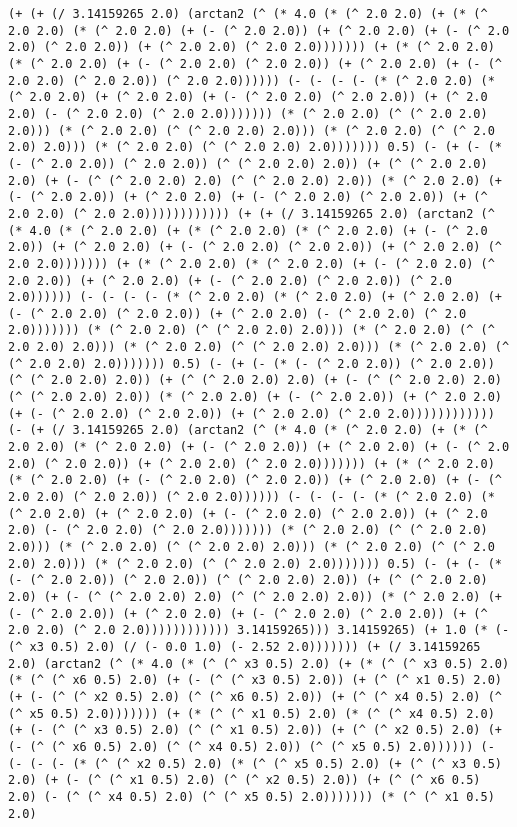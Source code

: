 \begin{lstlisting}
(+ (+ (/ 3.14159265 2.0) (arctan2 (^ (* 4.0 (* (^ 2.0 2.0) (+ (* (^ 2.0 2.0) (* (^ 2.0 2.0) (+ (- (^ 2.0 2.0)) (+ (^ 2.0 2.0) (+ (- (^ 2.0 2.0) (^ 2.0 2.0)) (+ (^ 2.0 2.0) (^ 2.0 2.0))))))) (+ (* (^ 2.0 2.0) (* (^ 2.0 2.0) (+ (- (^ 2.0 2.0) (^ 2.0 2.0)) (+ (^ 2.0 2.0) (+ (- (^ 2.0 2.0) (^ 2.0 2.0)) (^ 2.0 2.0)))))) (- (- (- (- (* (^ 2.0 2.0) (* (^ 2.0 2.0) (+ (^ 2.0 2.0) (+ (- (^ 2.0 2.0) (^ 2.0 2.0)) (+ (^ 2.0 2.0) (- (^ 2.0 2.0) (^ 2.0 2.0))))))) (* (^ 2.0 2.0) (^ (^ 2.0 2.0) 2.0))) (* (^ 2.0 2.0) (^ (^ 2.0 2.0) 2.0))) (* (^ 2.0 2.0) (^ (^ 2.0 2.0) 2.0))) (* (^ 2.0 2.0) (^ (^ 2.0 2.0) 2.0))))))) 0.5) (- (+ (- (* (- (^ 2.0 2.0)) (^ 2.0 2.0)) (^ (^ 2.0 2.0) 2.0)) (+ (^ (^ 2.0 2.0) 2.0) (+ (- (^ (^ 2.0 2.0) 2.0) (^ (^ 2.0 2.0) 2.0)) (* (^ 2.0 2.0) (+ (- (^ 2.0 2.0)) (+ (^ 2.0 2.0) (+ (- (^ 2.0 2.0) (^ 2.0 2.0)) (+ (^ 2.0 2.0) (^ 2.0 2.0)))))))))))) (+ (+ (/ 3.14159265 2.0) (arctan2 (^ (* 4.0 (* (^ 2.0 2.0) (+ (* (^ 2.0 2.0) (* (^ 2.0 2.0) (+ (- (^ 2.0 2.0)) (+ (^ 2.0 2.0) (+ (- (^ 2.0 2.0) (^ 2.0 2.0)) (+ (^ 2.0 2.0) (^ 2.0 2.0))))))) (+ (* (^ 2.0 2.0) (* (^ 2.0 2.0) (+ (- (^ 2.0 2.0) (^ 2.0 2.0)) (+ (^ 2.0 2.0) (+ (- (^ 2.0 2.0) (^ 2.0 2.0)) (^ 2.0 2.0)))))) (- (- (- (- (* (^ 2.0 2.0) (* (^ 2.0 2.0) (+ (^ 2.0 2.0) (+ (- (^ 2.0 2.0) (^ 2.0 2.0)) (+ (^ 2.0 2.0) (- (^ 2.0 2.0) (^ 2.0 2.0))))))) (* (^ 2.0 2.0) (^ (^ 2.0 2.0) 2.0))) (* (^ 2.0 2.0) (^ (^ 2.0 2.0) 2.0))) (* (^ 2.0 2.0) (^ (^ 2.0 2.0) 2.0))) (* (^ 2.0 2.0) (^ (^ 2.0 2.0) 2.0))))))) 0.5) (- (+ (- (* (- (^ 2.0 2.0)) (^ 2.0 2.0)) (^ (^ 2.0 2.0) 2.0)) (+ (^ (^ 2.0 2.0) 2.0) (+ (- (^ (^ 2.0 2.0) 2.0) (^ (^ 2.0 2.0) 2.0)) (* (^ 2.0 2.0) (+ (- (^ 2.0 2.0)) (+ (^ 2.0 2.0) (+ (- (^ 2.0 2.0) (^ 2.0 2.0)) (+ (^ 2.0 2.0) (^ 2.0 2.0)))))))))))) (- (+ (/ 3.14159265 2.0) (arctan2 (^ (* 4.0 (* (^ 2.0 2.0) (+ (* (^ 2.0 2.0) (* (^ 2.0 2.0) (+ (- (^ 2.0 2.0)) (+ (^ 2.0 2.0) (+ (- (^ 2.0 2.0) (^ 2.0 2.0)) (+ (^ 2.0 2.0) (^ 2.0 2.0))))))) (+ (* (^ 2.0 2.0) (* (^ 2.0 2.0) (+ (- (^ 2.0 2.0) (^ 2.0 2.0)) (+ (^ 2.0 2.0) (+ (- (^ 2.0 2.0) (^ 2.0 2.0)) (^ 2.0 2.0)))))) (- (- (- (- (* (^ 2.0 2.0) (* (^ 2.0 2.0) (+ (^ 2.0 2.0) (+ (- (^ 2.0 2.0) (^ 2.0 2.0)) (+ (^ 2.0 2.0) (- (^ 2.0 2.0) (^ 2.0 2.0))))))) (* (^ 2.0 2.0) (^ (^ 2.0 2.0) 2.0))) (* (^ 2.0 2.0) (^ (^ 2.0 2.0) 2.0))) (* (^ 2.0 2.0) (^ (^ 2.0 2.0) 2.0))) (* (^ 2.0 2.0) (^ (^ 2.0 2.0) 2.0))))))) 0.5) (- (+ (- (* (- (^ 2.0 2.0)) (^ 2.0 2.0)) (^ (^ 2.0 2.0) 2.0)) (+ (^ (^ 2.0 2.0) 2.0) (+ (- (^ (^ 2.0 2.0) 2.0) (^ (^ 2.0 2.0) 2.0)) (* (^ 2.0 2.0) (+ (- (^ 2.0 2.0)) (+ (^ 2.0 2.0) (+ (- (^ 2.0 2.0) (^ 2.0 2.0)) (+ (^ 2.0 2.0) (^ 2.0 2.0)))))))))))) 3.14159265))) 3.14159265) (+ 1.0 (* (- (^ x3 0.5) 2.0) (/ (- 0.0 1.0) (- 2.52 2.0))))))) (+ (/ 3.14159265 2.0) (arctan2 (^ (* 4.0 (* (^ (^ x3 0.5) 2.0) (+ (* (^ (^ x3 0.5) 2.0) (* (^ (^ x6 0.5) 2.0) (+ (- (^ (^ x3 0.5) 2.0)) (+ (^ (^ x1 0.5) 2.0) (+ (- (^ (^ x2 0.5) 2.0) (^ (^ x6 0.5) 2.0)) (+ (^ (^ x4 0.5) 2.0) (^ (^ x5 0.5) 2.0))))))) (+ (* (^ (^ x1 0.5) 2.0) (* (^ (^ x4 0.5) 2.0) (+ (- (^ (^ x3 0.5) 2.0) (^ (^ x1 0.5) 2.0)) (+ (^ (^ x2 0.5) 2.0) (+ (- (^ (^ x6 0.5) 2.0) (^ (^ x4 0.5) 2.0)) (^ (^ x5 0.5) 2.0)))))) (- (- (- (- (* (^ (^ x2 0.5) 2.0) (* (^ (^ x5 0.5) 2.0) (+ (^ (^ x3 0.5) 2.0) (+ (- (^ (^ x1 0.5) 2.0) (^ (^ x2 0.5) 2.0)) (+ (^ (^ x6 0.5) 2.0) (- (^ (^ x4 0.5) 2.0) (^ (^ x5 0.5) 2.0))))))) (* (^ (^ x1 0.5) 2.0) 
\end{lstlisting}
